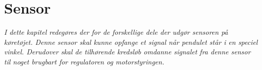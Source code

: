 \chapter{Sensor}\label{kap:chap_sensor}

\emph{I dette kapitel redegøres der for de forskellige dele der udgør sensoren på køretøjet. Denne sensor skal kunne opfange et signal når pendulet står i en speciel vinkel. Derudover skal de tilhørende kredsløb omdanne signalet fra denne sensor til noget brugbart for regulatoren og motorstyringen.}